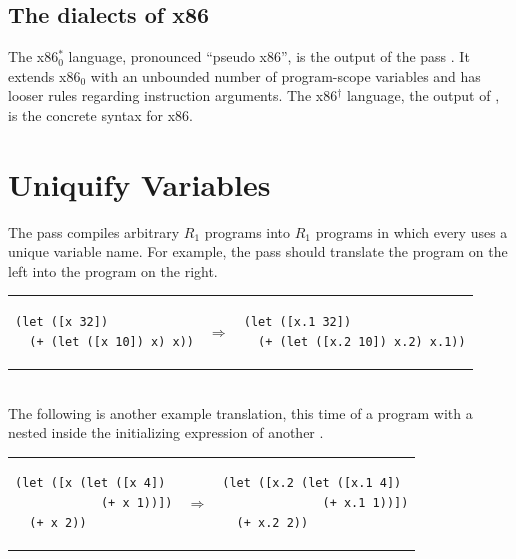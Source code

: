 \documentclass[11pt]{book}
\begin{document}
\subsection{The dialects of x86}

The x86$^{*}_0$ language, pronounced ``pseudo x86'', is the output of
the pass . It extends x86$_0$ with an
unbounded number of program-scope variables and has looser rules
regarding instruction arguments. The x86$^{\dagger}$ language, the
output of , is the concrete syntax for x86.


\section{Uniquify Variables}
\label{sec:uniquify-s0}

The  pass compiles arbitrary $R_1$ programs into $R_1$
programs in which every  uses a unique variable name. For
example, the  pass should translate the program on the
left into the program on the right. \\
\begin{tabular}{lll}
\begin{minipage}{0.4\textwidth}
\begin{lstlisting}
(let ([x 32])
  (+ (let ([x 10]) x) x))
\end{lstlisting}
\end{minipage}
&
$\Rightarrow$
&
\begin{minipage}{0.4\textwidth}
\begin{lstlisting}
(let ([x.1 32])
  (+ (let ([x.2 10]) x.2) x.1))
\end{lstlisting}
\end{minipage}
\end{tabular} \\
%
The following is another example translation, this time of a program
with a  nested inside the initializing expression of another
.\\
\begin{tabular}{lll}
\begin{minipage}{0.4\textwidth}
\begin{lstlisting}
(let ([x (let ([x 4])
            (+ x 1))])
  (+ x 2))
\end{lstlisting}
\end{minipage}
&
$\Rightarrow$
&
\begin{minipage}{0.4\textwidth}
\begin{lstlisting}
(let ([x.2 (let ([x.1 4])
              (+ x.1 1))])
  (+ x.2 2))
\end{lstlisting}
\end{minipage}
\end{tabular}
\end{document}
